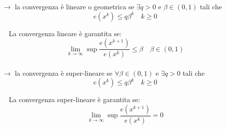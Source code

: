 \documentclass{report}
\begin{document}
$\rightarrow$ la convergenza è lineare o geometrica se $\exists q > 0$ e $\beta \in (0,1)$ tali che
\begin{equation}
	e(x^k) \leqslant q \beta^k \quad k \geqslant 0
\end{equation}

$\quad$La convergenza lineare è garantita se:
\begin{equation}
	\lim_{k \rightarrow \infty} \sup \frac{e(x^{k+1})}{e(x^k)} \leqslant \beta \quad \beta \in (0,1)
\end{equation}
\\

$\rightarrow$ la convergenza è super-lineare se $\forall \beta \in (0,1)$ e $\exists q > 0$ tali che
\begin{equation}
	e(x^k) \leqslant q \beta^k \quad k \geqslant 0
\end{equation}

$\quad$La convergenza super-lineare è garantita se:
\begin{equation}
	\lim_{k \rightarrow \infty} \sup \frac{e(x^{k+1})}{e(x^k)} = 0
\end{equation}
\\
\end{document}
